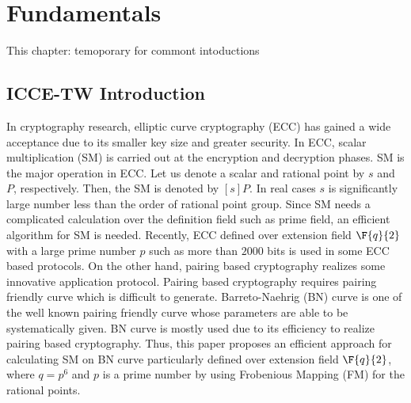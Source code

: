 \chapter{Fundamentals}
This chapter: temoporary for commont intoductions
\label{Chapter_intros}

\section{ICCE-TW Introduction}
In cryptography research, elliptic curve cryptography (ECC) has gained a wide acceptance due to its smaller key size and greater security. 
In ECC, scalar multiplication (SM) is carried out at the encryption and decryption phases. SM is the major operation in ECC. Let us denote a scalar and rational point by  $s$ and $P$, respectively. Then, the SM is denoted by $[s]P$. In real cases $s$ is significantly large number less than the order of rational point group. Since SM needs a complicated calculation over the definition field such as prime field, an efficient algorithm for SM is needed. Recently, ECC defined over extension field $\F{q}{2}$ with a large prime number $p$ such as more than $2000$ bits is used in some ECC based protocols. On the other hand, pairing based cryptography realizes some innovative application protocol. Pairing based cryptography requires pairing friendly curve which is difficult to generate. Barreto-Naehrig (BN) \cite{SAC:BarNae05} curve is one of the well known pairing friendly curve\cite{EPRINT:FreScoTes06} whose parameters are able to be systematically given. BN curve is mostly used due to its efficiency to realize pairing based cryptography. Thus, this paper proposes an efficient approach for calculating SM on BN curve particularly defined over extension field $\F{q}{2}$, where $q=p^6$ and $p$ is a prime number by using Frobenious Mapping (FM) for the rational points.


